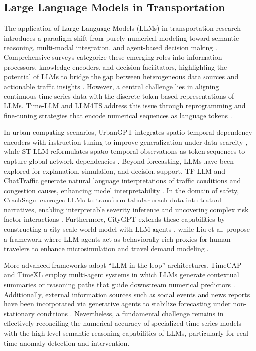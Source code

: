 \documentclass{article}
\begin{document}
\subsection{Large Language Models in Transportation}
The application of Large Language Models (LLMs) in transportation research introduces a paradigm shift from purely numerical modeling toward semantic reasoning, multi-modal integration, and agent-based decision making \cite{nie_exploring_2025, karim_large_2025}. Comprehensive surveys categorize these emerging roles into information processors, knowledge encoders, and decision facilitators, highlighting the potential of LLMs to bridge the gap between heterogeneous data sources and actionable traffic insights \cite{nie_exploring_2025}. However, a central challenge lies in aligning continuous time series data with the discrete token-based representations of LLMs. Time-LLM and LLM4TS address this issue through reprogramming and fine-tuning strategies that encode numerical sequences as language tokens \cite{jin_time-llm_2023, chang_llm4ts_2023}.

In urban computing scenarios, UrbanGPT integrates spatio-temporal dependency encoders with instruction tuning to improve generalization under data scarcity \cite{li_urbangpt_2024}, while ST-LLM reformulates spatio-temporal observations as token sequences to capture global network dependencies \cite{liu_spatial-temporal_2024}. Beyond forecasting, LLMs have been explored for explanation, simulation, and decision support. TF-LLM and ChatTraffic generate natural language interpretations of traffic conditions and congestion causes, enhancing model interpretability \cite{guo_explainable_2024, zhang_chattraffic_2024}. In the domain of safety, CrashSage leverages LLMs to transform tabular crash data into textual narratives, enabling interpretable severity inference and uncovering complex risk factor interactions \cite{zhen_crashsage_2025}. Furthermore, CityGPT extends these capabilities by constructing a city-scale world model with LLM-agents \cite{feng_citygpt_2024}, while Liu et al. propose a framework where LLM-agents act as behaviorally rich proxies for human travelers to enhance microsimulation and travel demand modeling \cite{liu_toward_2025}.

More advanced frameworks adopt ``LLM-in-the-loop'' architectures. TimeCAP and TimeXL employ multi-agent systems in which LLMs generate contextual summaries or reasoning paths that guide downstream numerical predictors \cite{lee_timecap_2025, jiang_explainable_2025}. Additionally, external information sources such as social events and news reports have been incorporated via generative agents to stabilize forecasting under non-stationary conditions \cite{wang_news_2024}. Nevertheless, a fundamental challenge remains in effectively reconciling the numerical accuracy of specialized time-series models with the high-level semantic reasoning capabilities of LLMs, particularly for real-time anomaly detection and intervention.
\end{document}

